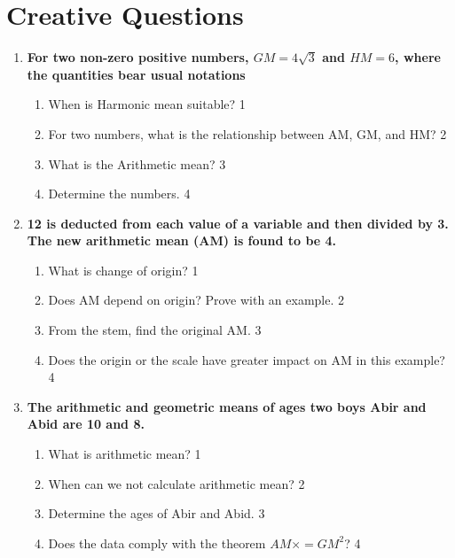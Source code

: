 \documentclass[a4paper,oneside]{book}
\begin{document}
\section{Creative Questions}
\begin{enumerate}

 \item
	  \textbf{For two non-zero positive numbers, $GM=4\sqrt3$ and $HM=6$, where the quantities bear usual notations} 
  
  \begin{enumerate}
    \item
	When is Harmonic mean suitable? \hfill 1
    \item
	For two numbers, what is the relationship between AM, GM, and HM? \hfill 2
    \item  
	What is the Arithmetic mean? \hfill 3
    \item
	Determine the numbers. \hfill 4
  \end{enumerate}
  
   \item
	  \textbf{12 is deducted from each value of a variable and then divided by 3. The new arithmetic mean (AM) is found to be 4.} 
  
  \begin{enumerate}
    \item
	What is change of origin? \hfill 1
    \item
	Does AM depend on origin? Prove with an example. \hfill 2
    \item  
	From the stem, find the original AM. \hfill 3
    \item
	Does the origin or the scale have greater impact on AM in this example? \hfill 4
  \end{enumerate}

   \item
	  \textbf{The arithmetic and geometric means of ages two boys Abir and Abid are 10 and 8.} 
  
  \begin{enumerate}
    \item
	What is arithmetic mean? \hfill 1
    \item
	When can we not calculate arithmetic mean? \hfill 2
    \item  
	Determine the ages of Abir and Abid. \hfill 3
    \item
	Does the data comply with the theorem $\displaystyle AM \times  = GM^2$? \hfill 4
  \end{enumerate}
  

\end{enumerate}
\end{document}

